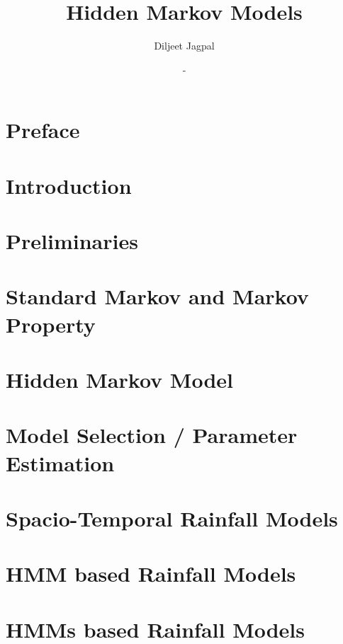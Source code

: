 \documentclass[a4paper,12pt]{report}
\title{\Huge Hidden Markov Models}
\author{Diljeet Jagpal}
\date{-}
\theoremstyle{plain}
\begin{document}
	\maketitle
	\tableofcontents

	\chapter*{Preface}
	

	\newpage

	\chapter{Introduction}
	
	\newpage

	\chapter{Preliminaries}
	
	\newpage

	\chapter{Standard Markov and Markov Property}
	
	\newpage

	\chapter{Hidden Markov Model}
	
	\newpage

	\chapter{Model Selection  / Parameter Estimation}
	
	\newpage

	\chapter{Spacio-Temporal Rainfall Models}
	
	\newpage

	\chapter{HMM based Rainfall Models}
	
	\newpage

	\chapter{HMMs based Rainfall Models}
	
	\newpage


	\nocite{*}
	\printbibliography
\end{document}
